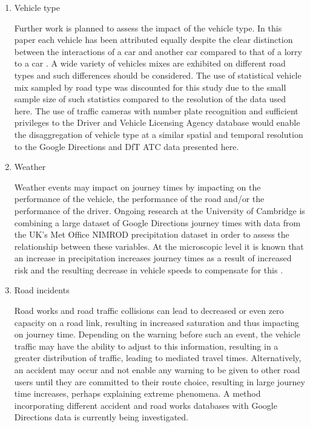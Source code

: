 \documentclass{CUP-JNL-DCE}
\begin{document}
\begin{enumerate}
	
	\item Vehicle type
	
	Further work is planned to assess the impact of the vehicle type. In this paper each vehicle has been attributed equally despite the clear distinction between the interactions of a car and another car compared to that of a lorry to a car \citep{vap2007investigating}. A wide variety of vehicles mixes are exhibited on different road types and such differences should be considered. The use of statistical vehicle mix sampled by road type \citep{DfT_car_stats} was discounted for this study due to the small sample size of such statistics compared to the resolution of the data used here. The use of traffic cameras with number plate recognition and sufficient privileges to the Driver and Vehicle Licensing Agency database would enable the disaggregation of vehicle type at a similar spatial and temporal resolution to the Google Directions and DfT ATC data presented here. 
	
	\item Weather
	
	Weather events may impact on journey times by impacting on the performance of the vehicle, the performance of the road and/or the performance of the driver. Ongoing research at the University of Cambridge is combining a large dataset of Google Directions journey times with data from the UK's Met Office NIMROD precipitation dataset \citep{met_office} in order to assess the relationship between these variables. At the microscopic level it is known that an increase in precipitation increases journey times as a result of increased risk and the resulting decrease in vehicle speeds to compensate for this \citep{mashros2014impact}. 
	
	\item Road incidents 
	
	Road works and road traffic collisions can lead to decreased or even zero capacity on a road link, resulting in increased saturation and thus impacting on journey time. Depending on the warning before such an event, the vehicle traffic may have the ability to adjust to this information, resulting in a greater distribution of traffic, leading to mediated travel times. Alternatively, an accident may occur and not enable any warning to be given to other road users until they are committed to their route choice, resulting in large journey time increases, perhaps explaining extreme phenomena. A method incorporating different accident and road works databases with Google Directions data is currently being investigated.
	

\end{enumerate}
\end{document}
